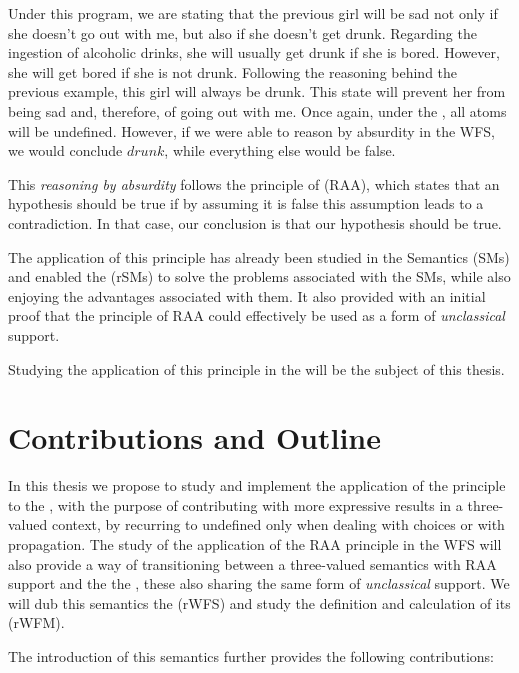 Under this program, we are stating that the previous girl will be sad not only if she doesn't go out with me, but also if she doesn't get drunk. Regarding the ingestion of alcoholic drinks, she will usually get drunk if she is bored. However, she will get bored if she is not drunk. Following the reasoning behind the previous example, this girl will always be drunk. This state will prevent her from being sad and, therefore, of going out with me. Once again, under the \wfs, all atoms will be undefined. However, if we were able to reason by absurdity in the WFS, we would conclude $drunk$, while everything else would be false.

This \emph{reasoning by absurdity} follows the principle of \raa (RAA), which states that an hypothesis should be true if by assuming it is false this assumption leads to a contradiction. In that case, our conclusion is that our hypothesis should be true. 

The application of this principle has already been studied in the \SMs Semantics\cite{smMain} (SMs) and enabled the \RSMs\cite{ampMSc,rsmEpia} (rSMs) to solve the problems associated with the SMs, while also enjoying the advantages associated with them. It also provided with an initial proof that the principle of RAA could effectively be used as a form of \emph{unclassical} support. 


Studying the application of this principle in the \wfs will be the subject of this thesis.


\section{Contributions and Outline}
In this thesis we propose to study and implement the application of the \raa principle to the \wfs, with the purpose of contributing with more expressive results in a three-valued context, by recurring to undefined only when dealing with choices or with propagation. The study of the application of the RAA principle in the WFS will also provide a way of transitioning between a three-valued semantics with RAA support and the the \rsms, these also sharing the same form of \emph{unclassical} support. We will dub this semantics the \RWFS (rWFS) and study the definition and calculation of its \RWFM (rWFM).

The introduction of this semantics further provides the following contributions:

